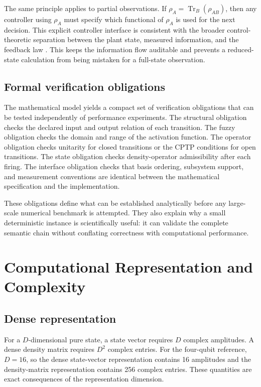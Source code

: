\documentclass[final,3p,times]{elsarticle}
\begin{document}
The same principle applies to partial observations. If $\rho_A=\operatorname{Tr}_B(\rho_{AB})$, then any controller using $\rho_A$ must specify which functional of $\rho_A$ is used for the next decision. This explicit controller interface is consistent with the broader control-theoretic separation between the plant state, measured information, and the feedback law \cite{ref17,ref18,ref19,ref20}. This keeps the information flow auditable and prevents a reduced-state calculation from being mistaken for a full-state observation.

\subsection{Formal verification obligations}

The mathematical model yields a compact set of verification obligations that can be tested independently of performance experiments. The structural obligation checks the declared input and output relation of each transition. The fuzzy obligation checks the domain and range of the activation function. The operator obligation checks unitarity for closed transitions or the CPTP conditions for open transitions. The state obligation checks density-operator admissibility after each firing. The interface obligation checks that basis ordering, subsystem support, and measurement conventions are identical between the mathematical specification and the implementation.

These obligations define what can be established analytically before any large-scale numerical benchmark is attempted. They also explain why a small deterministic instance is scientifically useful: it can validate the complete semantic chain without conflating correctness with computational performance.

\section{Computational Representation and Complexity}

\subsection{Dense representation}

For a $D$-dimensional pure state, a state vector requires $D$ complex amplitudes. A dense density matrix requires $D^2$ complex entries. For the four-qubit reference, $D=16$, so the dense state-vector representation contains 16 amplitudes and the density-matrix representation contains 256 complex entries. These quantities are exact consequences of the representation dimension.
\end{document}
